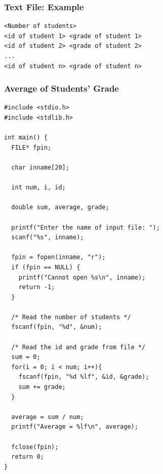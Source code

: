 \documentclass{../c-lecture}
\begin{document}
\begin{frame}[fragile]
  \frametitle{Text File: Example}
  \begin{verbatim}
<Number of students>
<id of student 1> <grade of student 1>
<id of student 2> <grade of student 2>
...
<id of student n> <grade of student n>
  \end{verbatim}
\end{frame}
\begin{frame}[fragile]
  \frametitle{Average of Students' Grade}
  \begin{verbatim}
#include <stdio.h>
#include <stdlib.h>

int main() {
  FILE* fpin;

  char inname[20];

  int num, i, id;

  double sum, average, grade;

  printf("Enter the name of input file: ");
  scanf("%s", inname);

  fpin = fopen(inname, "r");
  if (fpin == NULL) {
    printf("Cannot open %s\n", inname);
    return -1;
  }

  /* Read the number of students */
  fscanf(fpin, "%d", &num);

  /* Read the id and grade from file */
  sum = 0;
  for(i = 0; i < num; i++){
    fscanf(fpin, "%d %lf", &id, &grade);
    sum += grade;
  }

  average = sum / num;
  printf("Average = %lf\n", average);

  fclose(fpin);
  return 0;
}
  \end{verbatim}
\end{frame}
\end{document}
